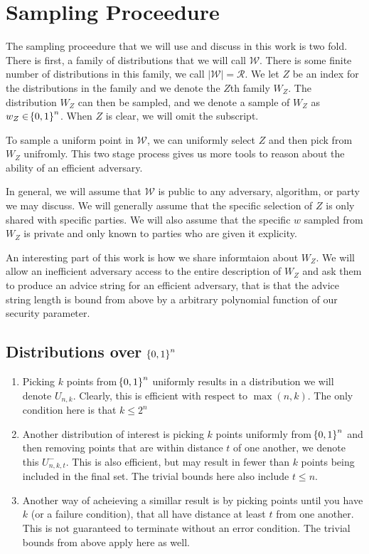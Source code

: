 
\section{Sampling Proceedure}
The sampling proceedure that we will use and discuss in this work is two fold.
There is first, a family of distributions that we will call $\mathcal{W}$. 
There is some finite number of distributions in this family, we call $|\mathcal{W}| = \mathcal{R}$. 
We let $Z$ be an index for the distributions in the family and we denote the $Z$th family $W_Z$. 
The distribution $W_Z$ can then be sampled, and we denote a sample of $W_Z$ as $w_{Z} \in \!\left\{ 0,1 \right\}^{n}$. When $Z$ is clear, we will omit the subscript.

To sample a uniform point in $\mathcal{W}$, we can uniformly select $Z$ and then pick from $W_Z$ unifromly. 
This two stage process gives us more tools to reason about the ability of an efficient adversary. 

In general, we will assume that $\mathcal{W}$ is public to any adversary, algorithm, or party we may discuss. 
We will generally assume that the specific selection of $Z$ is only shared with specific parties.
We will also assume that the specific $w$ sampled from $W_Z$ is private and only known to parties who are given it explicity. 

An interesting part of this work is how we share informtaion about $W_Z$. We will allow an inefficient adversary access to the entire description of $W_Z$ and ask them to produce an advice string for an efficient adversary, that is that the advice string length is bound from above by a arbitrary polynomial function of our security parameter. 

\subsection{Distributions over $\!\left\{ 0,1 \right\}^{n}$}
\begin{enumerate}
    \item Picking $k$ points from $\!\left\{ 0,1 \right\}^{n}$ uniformly results in a distribution we will denote $U_{n,k}$. 
    Clearly, this is efficient with respect to $\max{(n,k)}$.
    The only condition here is that $k \leq 2^n$

    \item Another distribution of interest is picking $k$ points uniformly from $\!\left\{ 0,1 \right\}^{n}$ and then removing points that are within distance $t$ of one another, we denote this $U_{n,k,t}^{-}$. 
    This is also efficient, but may result in fewer than $k$ points being included in the final set. 
    The trivial bounds here also include $t \leq n$. 

    \item Another way of acheieving a simillar result is by picking points until you have $k$ (or a failure condition), that all have distance at least $t$ from one another.
    This is not guaranteed to terminate without an error condition. 
    The trivial bounds from above apply here as well. 
\end{enumerate}
 